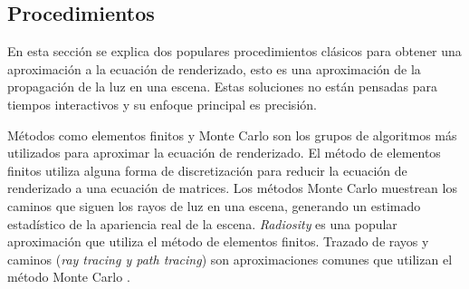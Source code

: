 \subsection{Procedimientos}
\label{sub:render_eq_procedures}
En esta sección se explica dos populares procedimientos clásicos para obtener una aproximación a la ecuación de renderizado, esto es una aproximación de la propagación de la luz en una escena. Estas soluciones no están pensadas para tiempos interactivos y su enfoque principal es precisión.

Métodos como elementos finitos y Monte Carlo son los grupos de algoritmos más utilizados para aproximar la ecuación de renderizado. El método de elementos finitos utiliza alguna forma de discretización para reducir la ecuación de renderizado a una ecuación de matrices. Los métodos Monte Carlo muestrean los caminos que siguen los rayos de luz en una escena, generando un estimado estadístico de la apariencia real de la escena. \emph{Radiosity} es una popular aproximación que utiliza el método de elementos finitos. Trazado de rayos y caminos (\emph{ray tracing y path tracing}) son aproximaciones comunes que utilizan el método Monte Carlo \cite{gi_renderingeq}. 

